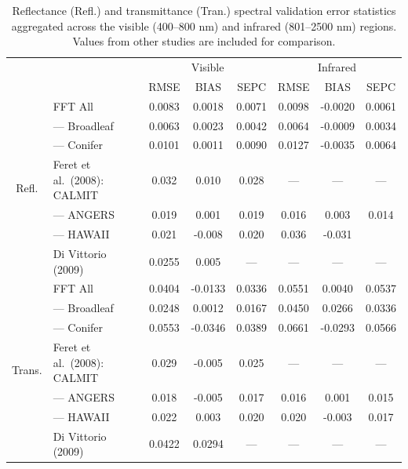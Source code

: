 \begin{table}
  \centering
  \caption{%
    Reflectance (Refl.) and transmittance (Tran.) spectral validation error statistics aggregated across the visible (400--800 nm) and infrared (801--2500 nm) regions.
    Values from other studies are included for comparison.
  }\label{tab:pecanrtm-specerr}
  \begin{tabular}{clcccccc}
    \toprule
    & & \multicolumn{3}{c}{Visible} & \multicolumn{3}{c}{Infrared}\\
    & & RMSE & BIAS & SEPC & RMSE & BIAS & SEPC \\
    \midrule
    \multirow{7}{*}{Refl.} & FFT All & 0.0083 & 0.0018 & 0.0071 & 0.0098 & -0.0020 & 0.0061 \\
                           & --- Broadleaf & 0.0063 & 0.0023 & 0.0042 & 0.0064 & -0.0009 & 0.0034 \\
                           & --- Conifer & 0.0101 & 0.0011 & 0.0090 & 0.0127 & -0.0035 & 0.0064 \\
                           & Feret et al.~(2008): CALMIT & 0.032 & 0.010 & 0.028 & --- & --- & --- \\
                           & --- ANGERS & 0.019 & 0.001 & 0.019 & 0.016 & 0.003 & 0.014 \\
                           & --- HAWAII & 0.021 & -0.008 & 0.020 & 0.036 & -0.031 \\
                           & Di Vittorio (2009) & 0.0255 & 0.005 & --- & --- & --- & --- \\
    \hline
    \multirow{7}{*}{Trans.} & FFT All & 0.0404 & -0.0133 & 0.0336 & 0.0551 & 0.0040 & 0.0537 \\
                            & --- Broadleaf & 0.0248 & 0.0012 & 0.0167 & 0.0450 & 0.0266 & 0.0336 \\
                            & --- Conifer & 0.0553 & -0.0346 & 0.0389 & 0.0661 & -0.0293 & 0.0566 \\
                            & Feret et al.~(2008): CALMIT & 0.029 & -0.005 & 0.025 & --- & --- & --- \\
                            & --- ANGERS & 0.018 & -0.005 & 0.017 & 0.016 & 0.001 & 0.015 \\
                            & --- HAWAII & 0.022 & 0.003 & 0.020 & 0.020 & -0.003 & 0.017 \\
                            & Di Vittorio (2009) & 0.0422 & 0.0294 & --- & --- & --- & --- \\
    \bottomrule
  \end{tabular}
\end{table}

